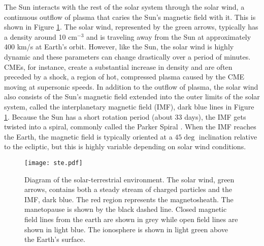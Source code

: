 The Sun interacts with the rest of the solar system through the solar wind, a continuous outflow of plasma that caries the Sun's magnetic field with it.  This is shown in Figure \ref{fig:ste}.  The solar wind, represented by the green arrows, typically has a density around 10 cm\(^{-3}\) and is traveling away from the Sun at approximately 400 km/s at Earth's orbit.  However, like the Sun, the solar wind is highly dynamic and these parameters can change drastically over a period of minutes.  CMEs, for instance, create a substantial increase in density and are often preceded by a shock, a region of hot, compressed plasma caused by the CME moving at supersonic speeds.  In addition to the outflow of plasma, the solar wind also consists of the Sun's magnetic field extended into the outer limits of the solar system, called the interplanetary magnetic field (IMF), dark blue lines in Figure \ref{fig:ste}.  Because the Sun has a short rotation period (about 33 days), the IMF gets twisted into a spiral, commonly called the Parker Spiral \citep{Parker1958}.  When the IMF reaches the Earth, the magnetic field is typically oriented at a \(45\deg\) inclination relative to the ecliptic, but this is highly variable depending on solar wind conditions.

\begin{figure}
	\texttt{[image: ste.pdf]}
	\caption[Solar-Terrestrial Environment]{Diagram of the solar-terrestrial environment.  The solar wind, green arrows, contains both a steady stream of charged particles and the IMF, dark blue.  The red region represents the magnetosheath.  The manetopause is shown by the black dashed line.  Closed magnetic field lines from the earth are shown in grey while open field lines are shown in light blue.  The ionosphere is shown in light green above the Earth's surface.}
	\label{fig:ste}
\end{figure}


